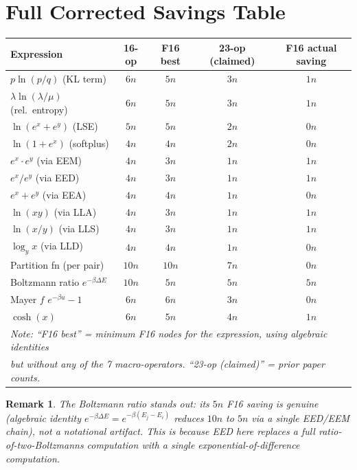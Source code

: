 \documentclass[11pt]{article}
\newtheorem{remark}[theorem]{Remark}
\begin{document}
\section{Full Corrected Savings Table}

\begin{center}
\renewcommand{\arraystretch}{1.3}
\begin{tabular}{lcccc}
\toprule
Expression & 16-op & F16 best & 23-op (claimed) & F16 actual saving \\
\midrule
$p\ln(p/q)$ (KL term) & $6n$ & $5n$ & $3n$ & $1n$ \\
$\lambda\ln(\lambda/\mu)$ (rel.\ entropy) & $6n$ & $5n$ & $3n$ & $1n$ \\
$\ln(e^x+e^y)$ (LSE) & $5n$ & $5n$ & $2n$ & $0n$ \\
$\ln(1+e^x)$ (softplus) & $4n$ & $4n$ & $2n$ & $0n$ \\
$e^x\cdot e^y$ (via EEM) & $4n$ & $3n$ & $1n$ & $1n$ \\
$e^x/e^y$ (via EED) & $4n$ & $3n$ & $1n$ & $1n$ \\
$e^x+e^y$ (via EEA) & $4n$ & $4n$ & $1n$ & $0n$ \\
$\ln(xy)$ (via LLA) & $4n$ & $3n$ & $1n$ & $1n$ \\
$\ln(x/y)$ (via LLS) & $4n$ & $3n$ & $1n$ & $1n$ \\
$\log_y x$ (via LLD) & $4n$ & $4n$ & $1n$ & $0n$ \\
Partition fn (per pair) & $10n$ & $10n$ & $7n$ & $0n$ \\
Boltzmann ratio $e^{-\beta\Delta E}$ & $10n$ & $5n$ & $5n$ & $5n$ \\
Mayer $f$ $e^{-\beta u}-1$ & $6n$ & $6n$ & $3n$ & $0n$ \\
$\cosh(x)$ & $6n$ & $5n$ & $4n$ & $1n$ \\
\midrule
\multicolumn{5}{l}{\textit{Note: ``F16 best'' = minimum F16 nodes for the expression, using algebraic identities}} \\
\multicolumn{5}{l}{\textit{but without any of the 7 macro-operators. ``23-op (claimed)'' = prior paper counts.}} \\
\bottomrule
\end{tabular}
\end{center}

\begin{remark}
The Boltzmann ratio stands out: its $5n$ F16 saving is genuine (algebraic identity
$e^{-\beta\Delta E} = e^{-\beta(E_j-E_i)}$ reduces $10n$ to $5n$ via a single EED/EEM chain),
not a notational artifact. This is because EED here replaces a full ratio-of-two-Boltzmanns
computation with a single exponential-of-difference computation.
\end{remark}
\end{document}
